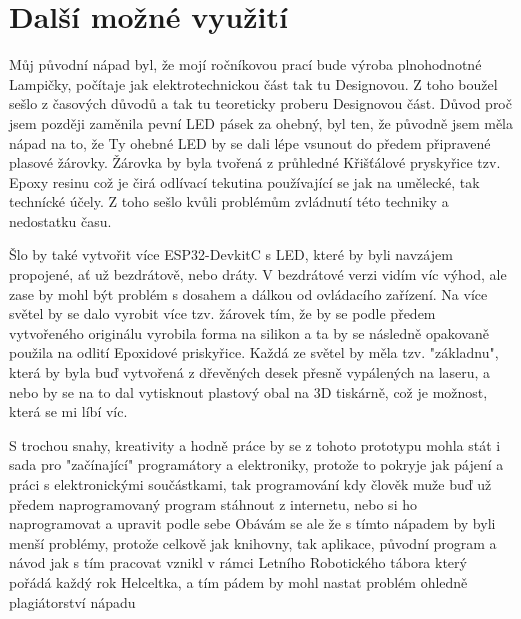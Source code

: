 \chapter{Další možné využití}

Můj původní nápad byl, že mojí ročníkovou prací bude výroba plnohodnotné Lampičky, počítaje jak elektrotechnickou část tak tu Designovou. Z toho boužel sešlo z časových důvodů a tak tu teoreticky proberu Designovou část. 
Důvod proč jsem později zaměnila pevní LED pásek za ohebný, byl ten, že původně jsem měla nápad na to, že Ty ohebné LED by se dali lépe vsunout do předem připravené plasové žárovky. Žárovka by byla tvořená z průhledné Křišťálové pryskyřice tzv. Epoxy resinu což je čirá odlívací tekutina používající se jak na umělecké, tak technícké účely. Z toho sešlo kvůli problémům zvládnutí této techniky a nedostatku času. %

Šlo by také vytvořit více ESP32-DevkitC s LED, které by byli navzájem propojené, ať už bezdrátově, nebo dráty. V bezdrátové verzi vidím víc výhod, ale zase by mohl být problém s dosahem a dálkou od ovládacího zařízení. 
Na více světel by se dalo vyrobit více tzv. žárovek tím, že by se podle předem vytvořeného originálu vyrobila forma na silikon a ta by se následně opakovaně použila na odlití Epoxidové priskyřice. Každá ze světel by měla tzv. "základnu", která by byla buď vytvořená z dřevěných desek přesně vypálených na laseru, a nebo by se na to dal vytisknout plastový obal na 3D tiskárně, což je možnost, která se mi líbí víc. 
	

S trochou snahy, kreativity a hodně práce by se z tohoto prototypu mohla stát i sada pro "začínající" programátory a elektroniky, protože to pokryje jak pájení a práci s elektronickými součástkami, tak programování kdy člověk muže buď už předem naprogramovaný program stáhnout z internetu, nebo si ho naprogramovat a upravit podle sebe Obávám se ale že s tímto nápadem by byli menší problémy, protože celkově jak knihovny, tak aplikace, původní program a návod jak s tím pracovat vznikl v rámci Letního Robotického tábora který pořádá každý rok Helceltka, a tím pádem by mohl nastat problém ohledně plagiátorství nápadu 


